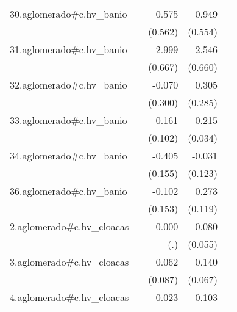 {\begin{longtable}{l*{4}{D{.}{.}{-1}}}
\addlinespace
30.aglomerado#c.hv\_banio&                     &       0.575         &       0.949         &                     \\
            &                     &     (0.562)         &     (0.554)         &                     \\
\addlinespace
31.aglomerado#c.hv\_banio&                     &      -2.999\sym{***}&      -2.546\sym{***}&                     \\
            &                     &     (0.667)         &     (0.660)         &                     \\
\addlinespace
32.aglomerado#c.hv\_banio&                     &      -0.070         &       0.305         &                     \\
            &                     &     (0.300)         &     (0.285)         &                     \\
\addlinespace
33.aglomerado#c.hv\_banio&                     &      -0.161         &       0.215\sym{***}&                     \\
            &                     &     (0.102)         &     (0.034)         &                     \\
\addlinespace
34.aglomerado#c.hv\_banio&                     &      -0.405\sym{**} &      -0.031         &                     \\
            &                     &     (0.155)         &     (0.123)         &                     \\
\addlinespace
36.aglomerado#c.hv\_banio&                     &      -0.102         &       0.273\sym{*}  &                     \\
            &                     &     (0.153)         &     (0.119)         &                     \\
\addlinespace
2.aglomerado#c.hv\_cloacas&                     &       0.000         &       0.080         &                     \\
            &                     &         (.)         &     (0.055)         &                     \\
\addlinespace
3.aglomerado#c.hv\_cloacas&                     &       0.062         &       0.140\sym{*}  &                     \\
            &                     &     (0.087)         &     (0.067)         &                     \\
\addlinespace
4.aglomerado#c.hv\_cloacas&                     &       0.023         &       0.103\sym{**} &                     \\

\end{longtable}}
